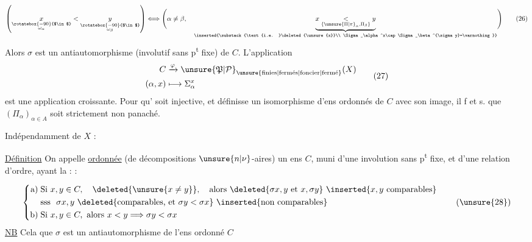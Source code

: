 \begingroup\makeatletter\tagsleft@true\makeatother
\[
\left(
\underset{\substack{\rotatebox{-90}{$\in$}\\\omega_\alpha}}{x}
<
\underset{\substack{\rotatebox{-90}{$\in$}\\\omega_\beta}}{y}
\right)
\Longleftrightarrow
\Biggl(\alpha\ne\beta,\quad
\underbrace{x\underset{\{\unsure{\Pi|\pi}_\alpha,\Pi_\beta\}}{<}y}_{
\inserted{\substack{\text{i.e. }\deleted{\unsure{x}}\\
\Sigma_\alpha^x\cap\Sigma_\beta^{\sigma y}=\varnothing}}}
\Biggr)
\tag*{(26)}
\]
Alors $\sigma$ est un antiautomorphisme (involutif sans p\textsuperscript{t} fixe) de $C$. L'application
\[
\begin{aligned}
C&\xrightarrow{\varphi}{\unsure{\mathfrak{P}|\mathcal{P}}}_{\unsure{\mathrm{finies}|\mathrm{ferm\acute{e}s}|\mathrm{foncier}|\mathrm{ferm\acute{e}}}}(X)\\
(\alpha,x)&\longmapsto\Sigma_\alpha^x
\end{aligned}
\tag*{(27)}
\]
est une application croissante. Pour qu' soit injective, et définisse un isomorphisme d'ens ordonnés de $C$ avec son image, il f et s. que $(\Pi_\alpha)_{\alpha\in A}$ soit strictement non panaché.

Indépendamment de $X$ :

\uline{Définition} On appelle \uline{  ordonnée} (de décompositions $\unsure{n|\nu}$-aires) un ens   $C$, muni d'une involution \inserted{$\sigma$} sans p\textsuperscript{t} fixe, et d'une relation d'ordre, ayant la :   :

  

\[
\left\{\begin{aligned}
\text{a)}\;&\text{Si }x,y\in C,\quad\deleted{\unsure{x\ne y}},\quad
\text{alors }\deleted{\sigma x,y\text{ et }x,\sigma y}\ 
\inserted{x,y\text{ comparables}}\\
&\text{sss }\ \sigma x,y\ \deleted{\text{comparables, et }\sigma y<\sigma x}\ \inserted{\text{non comparables}}\\
\text{b)}\;&\text{Si }x,y\in C,\ \text{alors }x<y\Longrightarrow\sigma y<\sigma x
\end{aligned}\right.
\tag*{(\unsure{28})}
\]
\uline{NB} Cela  que $\sigma$ est un antiautomorphisme de l'ens ordonné $C$
\endgroup
\clearpage
